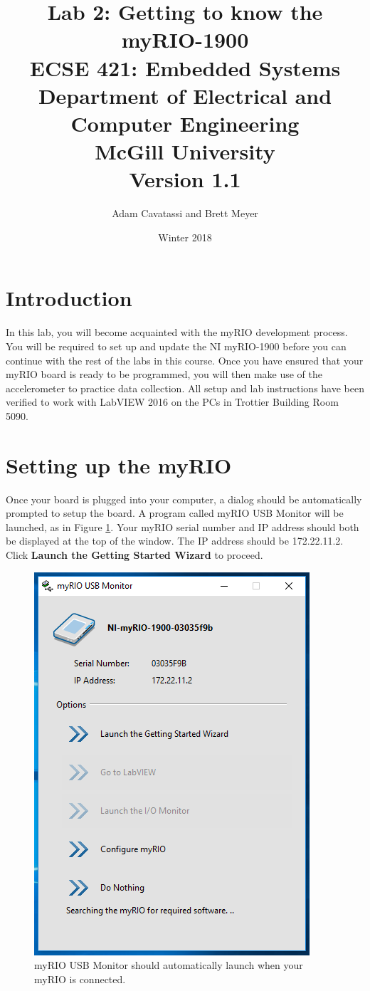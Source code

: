 \documentclass{article}
\title{Lab 2: Getting to know the myRIO-1900 \\
  \large ECSE 421: Embedded Systems \\ Department of Electrical and Computer Engineering \\ McGill University \\ Version 1.1}
\author{Adam Cavatassi and Brett Meyer}
\date{Winter 2018}
\begin{document}
\maketitle

\section{Introduction}
In this lab, you will become acquainted with the myRIO development process. You will be required to set up and update the NI myRIO-1900 before you can continue with the rest of the labs in this course. Once you have ensured that your myRIO board is ready to be programmed, you will then make use of the accelerometer to practice data collection. All setup and lab instructions have been verified to work with LabVIEW 2016 on the PCs in Trottier Building Room 5090.

\section{Setting up the myRIO}
Once your board is plugged into your computer, a dialog should be automatically prompted to setup the board. A program called myRIO USB Monitor will be launched, as in Figure \ref{fig:s_1}. Your myRIO serial number and IP address should both be displayed at the top of the window. The IP address should be 172.22.11.2. Click \textbf{Launch the Getting Started Wizard} to proceed. 

\begin{figure}[h!]
\centering
\includegraphics[scale=0.8]{figs/setup_1.png}
\caption{myRIO USB Monitor should automatically launch when your myRIO is connected.}
\label{fig:s_1}
\end{figure}
\end{document}

